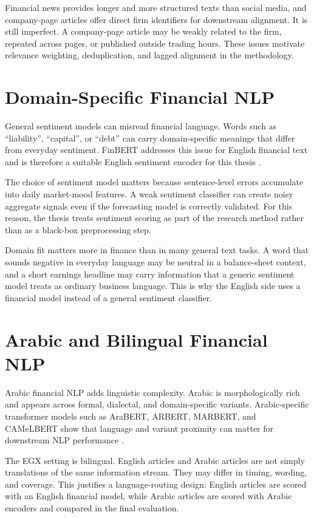 Financial news provides longer and more structured texts than social media, and company-page articles offer direct firm identifiers for downstream alignment. It is still imperfect. A company-page article may be weakly related to the firm, repeated across pages, or published outside trading hours. These issues motivate relevance weighting, deduplication, and lagged alignment in the methodology.

\section{Domain-Specific Financial NLP}

General sentiment models can misread financial language. Words such as ``liability'', ``capital'', or ``debt'' can carry domain-specific meanings that differ from everyday sentiment. FinBERT addresses this issue for English financial text and is therefore a suitable English sentiment encoder for this thesis \cite{araci2019finbert}.

The choice of sentiment model matters because sentence-level errors accumulate into daily market-mood features. A weak sentiment classifier can create noisy aggregate signals even if the forecasting model is correctly validated. For this reason, the thesis treats sentiment scoring as part of the research method rather than as a black-box preprocessing step.

Domain fit matters more in finance than in many general text tasks. A word that sounds negative in everyday language may be neutral in a balance-sheet context, and a short earnings headline may carry information that a generic sentiment model treats as ordinary business language. This is why the English side uses a financial model instead of a general sentiment classifier.

\section{Arabic and Bilingual Financial NLP}

Arabic financial NLP adds linguistic complexity. Arabic is morphologically rich and appears across formal, dialectal, and domain-specific variants. Arabic-specific transformer models such as AraBERT, ARBERT, MARBERT, and CAMeLBERT show that language and variant proximity can matter for downstream NLP performance \cite{antoun2020arabert, abdulmageed2021arbert, inoue2021camelbert}.

The EGX setting is bilingual. English articles and Arabic articles are not simply translations of the same information stream. They may differ in timing, wording, and coverage. This justifies a language-routing design: English articles are scored with an English financial model, while Arabic articles are scored with Arabic encoders and compared in the final evaluation.

